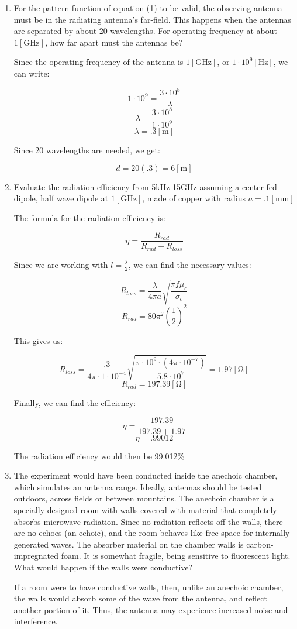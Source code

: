 \begin{enumerate}

  \item For the pattern function of equation (1) to be valid, the observing antenna must be in the radiating antenna's far-field. This happens when the antennas are separated by about 20 wavelengths. For operating frequency at about $1[\si{\giga\hertz}]$, how far apart must the antennas be?

    Since the operating frequency of the antenna is $1[\si{\giga\hertz}]$, or $1\cdot10^9[\si{\hertz}]$, we can write:

    $$1\cdot10^9=\frac{3\cdot 10^8}{\lambda}$$
    $$\lambda=\frac{3\cdot10^8}{1\cdot10^9}$$
    $$\lambda=.3[\si{\meter}]$$

    Since 20 wavelengths are needed, we get:

    $$d=20(.3)=6[\si{\meter}]$$

  \item Evaluate the radiation efficiency from 5kHz-15GHz assuming a center-fed dipole, half wave dipole at $1[\si{\giga\hertz}]$, made of copper with radius $a=.1[\si{\milli\meter}]$

    The formula for the radiation efficiency is:

    $$\eta=\frac{R_{rad}}{R_{rad}+R_{loss}}$$

    Since we are working with $l=\frac{\lambda}{2}$, we can find the necessary values:

    $$R_{loss}=\frac{\lambda}{4\pi a}\sqrt{\frac{\pi f\mu_c}{\sigma_c}}$$
    $$R_{rad}=80\pi^2\left( \frac{1}{2} \right)^2$$

    This gives us:

    $$R_{loss}=\frac{.3}{4\pi\cdot1\cdot10^{-4}}\sqrt{\frac{\pi\cdot10^9\cdot(4\pi\cdot10^{-7})}{5.8\cdot10^7}}=1.97[\si{\ohm}]$$
    $$R_{rad}=197.39[\si{\ohm}]$$

    Finally, we can find the efficiency:

    $$\eta=\frac{197.39}{197.39+1.97}$$
    $$\eta=.99012$$

    The radiation efficiency would then be 99.012\%

  \item The experiment would have been conducted inside the anechoic chamber, which simulates an antenna range. Ideally, antennas should be tested outdoors, across fields or between mountains. The anechoic chamber is a specially designed room with walls covered with material that completely absorbs microwave radiation. Since no radiation reflects off the walls, there are no echoes (an-echoic), and the room behaves like free space for internally generated waves. The absorber material on the chamber walls is carbon-impregnated foam. It is somewhat fragile, being sensitive to fluorescent light. What would happen if the walls were conductive?

    If a room were to have conductive walls, then, unlike an anechoic chamber, the walls would absorb some of the wave from the antenna, and reflect another portion of it. Thus, the antenna may experience increased noise and interference.

\end{enumerate}



